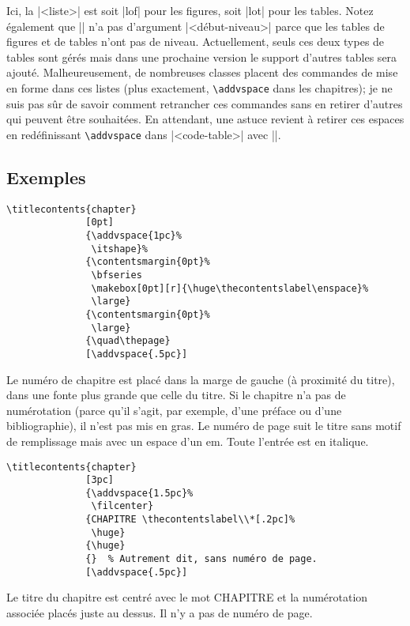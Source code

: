 \documentclass[a4paper]{ltxguide}
\begin{document}
Ici, la |<liste>| est soit |lof| pour les figures, soit |lot| pour les tables.
Notez également que |\printlist| n'a pas d'argument |<début-niveau>| parce que
les tables de figures et de tables n'ont pas de niveau. Actuellement, seuls
ces deux types de tables sont gérés mais dans une prochaine version le support
d'autres tables sera ajouté. Malheureusement, de nombreuses classes placent
des commandes de mise en forme dans ces listes (plus exactement, 
\verb|\addvspace| dans les chapitres); je ne suis pas sûr de savoir comment
retrancher ces commandes sans en retirer d'autres qui peuvent être souhaitées. 
En attendant, une astuce revient à retirer ces espaces en redéfinissant
\verb|\addvspace| dans |<code-table>| avec |\renewcommand\addvspace[1]{}|.

\subsection{Exemples}

\begin{verbatim}
\titlecontents{chapter}
              [0pt]
              {\addvspace{1pc}%
               \itshape}%
              {\contentsmargin{0pt}%
               \bfseries
               \makebox[0pt][r]{\huge\thecontentslabel\enspace}%
               \large}
              {\contentsmargin{0pt}%
               \large}
              {\quad\thepage}
              [\addvspace{.5pc}]
\end{verbatim}

Le numéro de chapitre est placé dans la marge de gauche (à proximité du titre),
dans une fonte plus grande que celle du titre. Si le chapitre n'a pas de
numérotation (parce qu'il s'agit, par exemple, d'une préface ou d'une
bibliographie), il n'est pas mis en gras.  Le numéro de page suit le titre sans
motif de remplissage mais avec un espace d'un em. Toute l'entrée est en
italique.

\begin{verbatim}
\titlecontents{chapter}
              [3pc]
              {\addvspace{1.5pc}%
               \filcenter}
              {CHAPITRE \thecontentslabel\\*[.2pc]%
               \huge}
              {\huge}
              {}  % Autrement dit, sans numéro de page.
              [\addvspace{.5pc}]
\end{verbatim}
              
Le titre du chapitre est centré avec le mot \og CHAPITRE \fg{} et la
numérotation associée placés juste au dessus. Il n'y a pas de numéro de
page.
\end{document}
